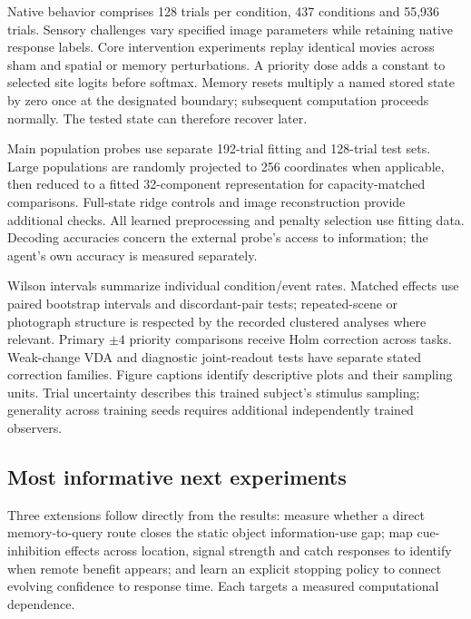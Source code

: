 \documentclass[11pt,letterpaper]{article}
\begin{document}
Native behavior comprises 128 trials per condition, 437 conditions and 55,936 trials. Sensory challenges vary specified image parameters while retaining native response labels. Core intervention experiments replay identical movies across sham and spatial or memory perturbations. A priority dose adds a constant to selected site logits before softmax. Memory resets multiply a named stored state by zero once at the designated boundary; subsequent computation proceeds normally. The tested state can therefore recover later.

Main population probes use separate 192-trial fitting and 128-trial test sets. Large populations are randomly projected to 256 coordinates when applicable, then reduced to a fitted 32-component representation for capacity-matched comparisons. Full-state ridge controls and image reconstruction provide additional checks. All learned preprocessing and penalty selection use fitting data. Decoding accuracies concern the external probe's access to information; the agent's own accuracy is measured separately.

Wilson intervals summarize individual condition/event rates. Matched effects use paired bootstrap intervals and discordant-pair tests; repeated-scene or photograph structure is respected by the recorded clustered analyses where relevant. Primary $\pm4$ priority comparisons receive Holm correction across tasks. Weak-change VDA and diagnostic joint-readout tests have separate stated correction families. Figure captions identify descriptive plots and their sampling units. Trial uncertainty describes this trained subject's stimulus sampling; generality across training seeds requires additional independently trained observers.

\subsection*{Most informative next experiments}
Three extensions follow directly from the results: measure whether a direct memory-to-query route closes the static object information-use gap; map cue-inhibition effects across location, signal strength and catch responses to identify when remote benefit appears; and learn an explicit stopping policy to connect evolving confidence to response time. Each targets a measured computational dependence.

\clearpage

\end{document}
